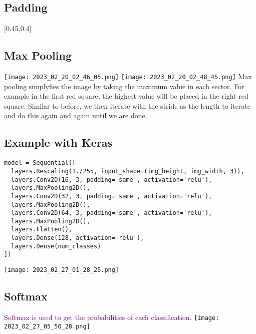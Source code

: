 \documentclass[main.tex,fontsize=8pt,paper=a4,paper=portrait,DIV=calc,]{scrartcl}
\begin{document}
\subsection{Padding}
[0.45,0.4]

\subsection{Max Pooling}
\texttt{[image: 2023\_02\_20\_02\_46\_05.png]}\newline
\texttt{[image: 2023\_02\_20\_02\_48\_45.png]}\newline
Max pooling simplyfies the image by taking the maximum value in each sector.\newline
For example in the first red square, the highest value will be placed in the right red square.\newline
Similar to before, we then iterate with the stride as the length to iterate and do this again and again until we are done.

\subsection{Example with Keras}
\begin{lstlisting}
model = Sequential([
  layers.Rescaling(1./255, input_shape=(img_height, img_width, 3)),
  layers.Conv2D(16, 3, padding='same', activation='relu'),
  layers.MaxPooling2D(),
  layers.Conv2D(32, 3, padding='same', activation='relu'),
  layers.MaxPooling2D(),
  layers.Conv2D(64, 3, padding='same', activation='relu'),
  layers.MaxPooling2D(),
  layers.Flatten(),
  layers.Dense(128, activation='relu'),
  layers.Dense(num_classes)
])
\end{lstlisting}
\texttt{[image: 2023\_02\_27\_01\_28\_25.png]}

\subsection{Softmax}
\textcolor{purple}{Softmax is used to get the probabilities of each classification.}
\texttt{[image: 2023\_02\_27\_05\_50\_28.png]}
\end{document}
